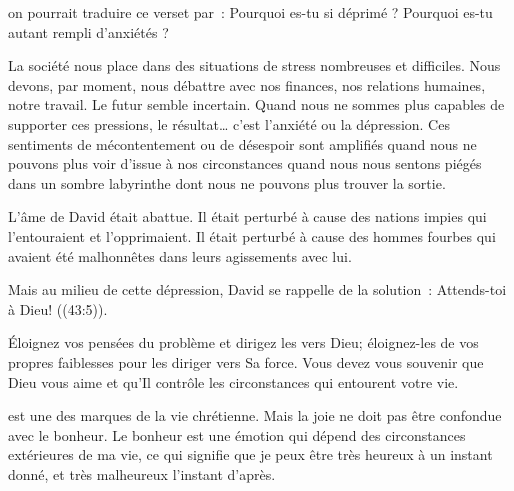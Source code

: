 


 on pourrait traduire ce verset par~:
 \og Pourquoi es-tu si déprimé ?
 Pourquoi es-tu autant rempli d'anxiétés ? \fg{}

La société nous place dans des situations de stress nombreuses et difficiles.
 Nous devons, par moment, nous débattre avec nos finances,
 nos relations humaines, notre travail.
 Le futur semble incertain. Quand nous ne sommes plus capables
 de supporter ces pressions, le résultat\dots{}
 c'est l'anxiété ou la dépression.
 Ces sentiments de mécontentement ou de désespoir sont amplifiés
 quand nous ne pouvons plus voir d'issue à nos circonstances
 \ocadr quand nous nous sentons piégés dans un sombre labyrinthe
 dont nous ne pouvons plus trouver la sortie. 

L'âme de David était abattue. Il était perturbé à cause des nations impies
 qui l'entouraient et l'opprimaient.
 Il était perturbé à cause des hommes fourbes qui avaient été malhonnêtes
 dans leurs agissements avec lui. 

Mais au milieu de cette dépression, David se rappelle de la solution~:
 \og Attends-toi à Dieu! \fg{} ((43:5)).


Éloignez vos pensées du problème et dirigez les vers Dieu;
 éloignez-les de vos propres faiblesses pour les diriger vers Sa force.
 Vous devez vous souvenir que Dieu vous aime et qu'Il contrôle
 les circonstances qui entourent votre vie. 

\dvrule






 est une des marques de la vie chrétienne.
 Mais la joie ne doit pas être confondue avec le bonheur.
 Le bonheur est une émotion qui dépend des circonstances
 extérieures de ma vie, ce qui signifie que je peux être très heureux
 à un instant donné, et très malheureux l'instant d'après. 

